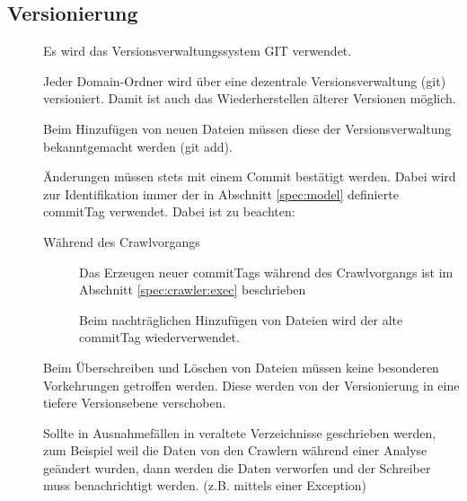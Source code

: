 \subsection{Versionierung}
\begin{description}
	\item []
		Es wird das Versionsverwaltungssystem GIT verwendet.
	\item []	
		Jeder Domain-Ordner wird über eine dezentrale Versionsverwaltung (git) versioniert. 
		Damit ist auch das Wiederherstellen älterer Versionen möglich.
	\item []
		Beim Hinzufügen von neuen Dateien müssen diese der Versionsverwaltung bekanntgemacht werden (git add).
	\item []
		Änderungen müssen stets mit einem Commit bestätigt werden.
		Dabei wird zur Identifikation immer der in Abschnitt \ref{spec:model} 
		definierte commitTag verwendet.
		Dabei ist zu beachten:
		\begin{description}
			\item [Während des Crawlvorgangs]
				Das Erzeugen neuer commitTags während des Crawlvorgangs ist 
				im Abschnitt \ref{spec:crawler:exec} beschrieben
			\item []
				Beim nachträglichen Hinzufügen von Dateien wird der alte commitTag wiederverwendet.
		\end{description}
	\item []
		Beim Überschreiben und Löschen von Dateien müssen keine besonderen Vorkehrungen getroffen werden.
		Diese werden von der Versionierung in eine tiefere Versionsebene verschoben.
	\item []
		Sollte in Ausnahmefällen in veraltete Verzeichnisse geschrieben werden, 
		zum Beispiel weil die Daten von den Crawlern während einer Analyse geändert wurden,
		dann werden die Daten verworfen und der Schreiber muss benachrichtigt werden.
		(z.B. mittels einer Exception)
\end{description}


